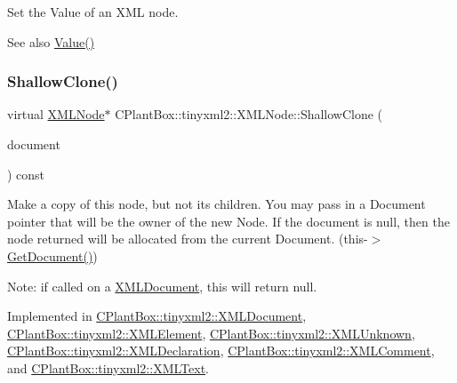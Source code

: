 Set the Value of an X\+ML node. \begin{DoxySeeAlso}{See also}
\hyperlink{classCPlantBox_1_1tinyxml2_1_1XMLNode_ac218177e0866a8c6c6063d9a96238fee}{Value()} 
\end{DoxySeeAlso}
\mbox{\label{classCPlantBox_1_1tinyxml2_1_1XMLNode_a8439e4e87206b26bc03427ffac3e882a}} 
\subsubsection{\texorpdfstring{Shallow\+Clone()}{ShallowClone()}}
{\footnotesize\ttfamily virtual \hyperlink{classCPlantBox_1_1tinyxml2_1_1XMLNode}{X\+M\+L\+Node}$\ast$ C\+Plant\+Box\+::tinyxml2\+::\+X\+M\+L\+Node\+::\+Shallow\+Clone (\begin{DoxyParamCaption}\item[{\hyperlink{classCPlantBox_1_1tinyxml2_1_1XMLDocument}{X\+M\+L\+Document} $\ast$}]{document }\end{DoxyParamCaption}) const\hspace{0.3cm}{\ttfamily [pure virtual]}}

Make a copy of this node, but not its children. You may pass in a Document pointer that will be the owner of the new Node. If the \textquotesingle{}document\textquotesingle{} is null, then the node returned will be allocated from the current Document. (this-\/$>$\hyperlink{classCPlantBox_1_1tinyxml2_1_1XMLNode_ac0d1a9be320497a51e7a202881a2352e}{Get\+Document()})

Note\+: if called on a \hyperlink{classCPlantBox_1_1tinyxml2_1_1XMLDocument}{X\+M\+L\+Document}, this will return null. 

Implemented in \hyperlink{classCPlantBox_1_1tinyxml2_1_1XMLDocument_a5de1843a6497c0ec45a36022ab22fc77}{C\+Plant\+Box\+::tinyxml2\+::\+X\+M\+L\+Document}, \hyperlink{classCPlantBox_1_1tinyxml2_1_1XMLElement_aef0ff3a4acbaefbf2bea75cde7680d64}{C\+Plant\+Box\+::tinyxml2\+::\+X\+M\+L\+Element}, \hyperlink{classCPlantBox_1_1tinyxml2_1_1XMLUnknown_ae4ab3d5b1c02b09ad91729cc12f2e08e}{C\+Plant\+Box\+::tinyxml2\+::\+X\+M\+L\+Unknown}, \hyperlink{classCPlantBox_1_1tinyxml2_1_1XMLDeclaration_a955c5e437aa8423ee194a69a42549f60}{C\+Plant\+Box\+::tinyxml2\+::\+X\+M\+L\+Declaration}, \hyperlink{classCPlantBox_1_1tinyxml2_1_1XMLComment_a08324700df05eaef00eec535ef5e02e3}{C\+Plant\+Box\+::tinyxml2\+::\+X\+M\+L\+Comment}, and \hyperlink{classCPlantBox_1_1tinyxml2_1_1XMLText_ac0dd7bbd05ed931505a5f214ee7c1fe8}{C\+Plant\+Box\+::tinyxml2\+::\+X\+M\+L\+Text}.

